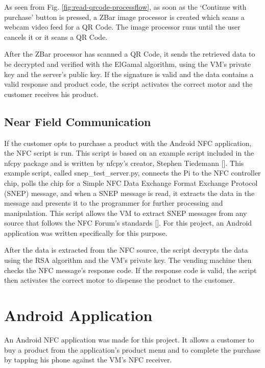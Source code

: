 As seen from Fig. \ref{fig:read-qrcode-processflow}, as soon as the `Continue
with purchase' button is pressed, a ZBar image processor is created
which scans a webcam video feed for a QR Code. The image processor runs until the user
cancels it or it scans a QR Code. 

After the ZBar processor has scanned a QR Code, it sends the retrieved data to
be decrypted and verified with the ElGamal algorithm, using the VM's
private key and the server's public key. If the signature is valid and the data
contains a valid response and product code, the script activates the correct
motor and the customer receives his product. 

\subsection{Near Field Communication}

If the customer opts to purchase a product with the Android NFC application, the NFC
script is run. This script is based on an example script included in the nfcpy package and is written by nfcpy's creator, Stephen
Tiedemann [\cite{website:nfcpy}]. This example script, called snep\_test\_server.py,
connects the Pi to the NFC controller chip, polls the chip for a Simple NFC Data Exchange Format
Exchange Protocol (SNEP) message, and when a SNEP message is read, it extracts the data
in the message and presents it to the programmer for further processing and manipulation.
This script allows the VM to extract SNEP messages from any source that
follows the NFC Forum's standards [\cite{website:nfc-forum}]. For this project, an
Android application was written specifically for this purpose.

After the data is extracted from the NFC source, the script decrypts the data
using the RSA algorithm and the VM's private key. The vending
machine then checks the NFC message's response code. If the response code is valid, the
script then activates the correct motor to dispense the product to the customer.

\section{Android Application}
\label{sec:nfc-android-app}

An Android NFC application was made for this project. It allows a customer to buy a
product from the application's product menu and to complete the purchase by tapping
his phone against the VM's NFC receiver.

